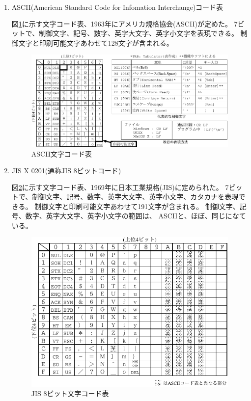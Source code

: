 \documentclass[a4j,dvipdfmx]{jarticle}
\begin{document}
\begin{enumerate}
\begin{enumerate}
\item ASCII(American Standard Code for Infomation Interchange)コード表

図\ref{fig2}に示す文字コード表、1963年にアメリカ規格協会(ASCII)が定めた。
7ビットで、制御文字、記号、数字、英字大文字、英字小文字を表現できる。
制御文字と印刷可能文字あわせて128文字が含まれる。

\begin{figure}[hbtp]
\begin{center}
\includegraphics[scale=0.9]{ascii.pdf}
\caption{ASCII文字コード表}
\label{fig2}
\end{center}
\end{figure}

\item JIS X 0201(通称JIS 8ビットコード)

図\ref{fig3}に示す文字コード表、1969年に日本工業規格(JIS)に定められた。
7ビットで、制御文字、記号、数字、英字大文字、英字小文字、カタカナを表現できる。
制御文字と印刷可能文字あわせて191文字が含まれる。
制御文字、記号、数字、英字大文字、英字小文字の範囲は、
ASCIIと、ほぼ、同じになている。

\begin{figure}[hbtp]
\begin{center}
\includegraphics[scale=0.9]{jisx0201.pdf}
\caption{JIS 8ビット文字コード表}
\label{fig3}
\end{center}
\end{figure}


\end{enumerate}
\end{enumerate}
\end{document}
